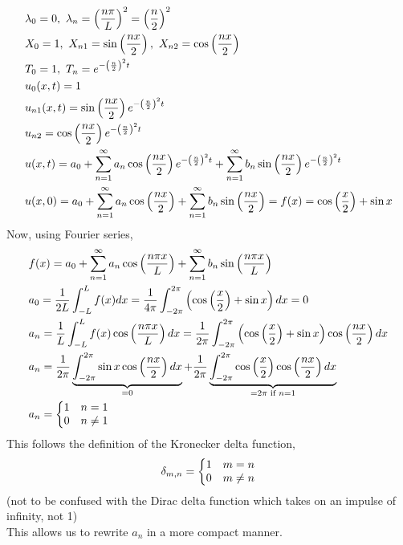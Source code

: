 \documentclass[11pt, fleqn]{article}
\begin{document}
\begin{align*}
    &\lambda_0=0,\ \lambda_n=\brround{\frac{n\pi}{L}}^2=\brround{\frac{n}{2}}^2\\
    &X_0=1,\ X_{n1}=\sin\brround{\frac{nx}{2}},\ X_{n2}=\cos\brround{\frac{nx}{2}}\\
    &T_0=1,\ T_n=e^{-\brround{\frac{n}{2}}^2t}\\
    &u_0(x,t)=1\\
    &u_{n1}(x,t)=\sin\brround{\frac{nx}{2}}e^{-\brround{\frac{n}{2}}^2t}\\
    &u_{n2}=\cos\brround{\frac{nx}{2}}e^{-\brround{\frac{n}{2}}^2t}\\
    &u(x,t)=a_0+\sum_{n=1}^\infty a_n\cos\brround{\frac{nx}{2}}e^{-\brround{\frac{n}{2}}^2t}+\sum_{n=1}^\infty b_n\sin\brround{\frac{nx}{2}}e^{-\brround{\frac{n}{2}}^2t}\\
    &u(x,0)=a_0+\sum_{n=1}^\infty a_n\cos\brround{\frac{nx}{2}}+\sum_{n=1}^\infty b_n\sin\brround{\frac{nx}{2}}=f(x)=\cos\brround{\frac{x}{2}}+\sin x
\end{align*}
Now, using Fourier series,
\begin{align*}
    &f(x)=a_0+\sum_{n=1}^\infty a_n\cos\left( \frac{n\pi x}{L} \right)+\sum_{n=1}^\infty b_n\sin\left( \frac{n\pi x}{L} \right)\\
    &a_0=\frac{1}{2L}\int_{-L}^L f(x)dx=\frac{1}{4\pi}\int_{-2\pi}^{2\pi}\left( \cos\left( \frac{x}{2} \right)+\sin x \right)dx=0\\
    &a_n=\frac{1}{L}\int_{-L}^L f(x)\cos\left( \frac{n\pi x}{L} \right)dx=\frac{1}{2\pi}\int_{-2\pi}^{2\pi}\left( \cos\left( \frac{x}{2} \right)+\sin x \right)\cos\left( \frac{nx}{2} \right)dx\\
    &a_n=\frac{1}{2\pi}\underbrace{\int_{-2\pi}^{2\pi}\sin x\cos\left( \frac{nx}{2} \right)dx}_{=0}+\frac{1}{2\pi}\underbrace{\int_{-2\pi}^{2\pi}\cos\left( \frac{x}{2} \right)\cos\left( \frac{nx}{2} \right)dx}_{=2\pi\text{ if }n=1}\\
    &a_n=\left\{\begin{matrix} 1 & n=1\\ 0 & n\neq 1 \end{matrix}\right.
\end{align*}
This follows the definition of the Kronecker delta function,
$$\delta_{m,n}=\left\{\begin{matrix} 1 & m=n\\ 0 & m\neq n \end{matrix}\right.$$
(not to be confused with the Dirac delta function which takes on an impulse of infinity, not 1)\\
This allows us to rewrite $a_n$ in a more compact manner.
\end{document}
